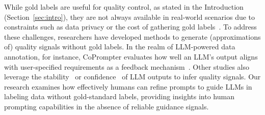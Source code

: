 While gold labels are useful for quality control, as stated in the Introduction (Section~\ref{sec:intro}), %
they are not always available in real-world scenarios due to constraints such as data privacy or the cost of gathering gold labels~\cite{liu2019deep, yang2019evaluating, oikarinen2021detecting, slote2024unlocking}.
To address these challenges, researchers have developed methods to generate (approximations of) quality signals without gold labels. 
In the realm of LLM-powered data annotation, for instance, CoPrompter evaluates how well an LLM's output aligns with user-specified requirements as a feedback mechanism~\cite{joshi2024coprompter}. %
Other studies also leverage the stability~\cite{chiang2023can} %
or confidence~\cite{gligoric2024can} %
of LLM outputs to infer quality signals.
Our research examines how effectively humans can refine prompts to guide LLMs in labeling data without gold-standard labels, providing insights into human prompting capabilities in the absence of reliable guidance signals.










